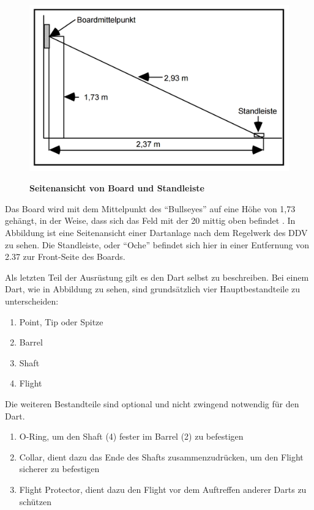 \begin{figure}
\includegraphics[width=\textwidth]{media/Dartsfield}\\
\caption{\textbf{Seitenansicht von Board und Standleiste 
\cite[8]{DartsRegel2016}}
}
\label{Fig:dartsetup}
\end{figure}


Das Board wird mit dem Mittelpunkt des "`Bullseyes"' auf eine Höhe von 1,73 gehängt, in der Weise, dass sich das Feld mit der 20 mittig oben befindet \autocite[6-8]{DartsRegel2016}. In Abbildung  ist eine Seitenansicht einer Dartanlage nach dem Regelwerk des DDV zu sehen. Die Standleiste, oder "`Oche"' befindet sich hier in einer Entfernung von 2.37 zur Front-Seite des Boards. 

Als letzten Teil der Ausrüstung gilt es den Dart selbst zu beschreiben. Bei einem Dart, wie in Abbildung  zu sehen, sind grundsätzlich vier Hauptbestandteile zu unterscheiden:
\begin{enumerate}
    \item Point, Tip oder Spitze
    \item Barrel
    \addtocounter{enumi}{1}
    \item Shaft
    \addtocounter{enumi}{1}
    \item Flight
\end{enumerate}
Die weiteren Bestandteile sind optional und nicht zwingend notwendig für den Dart. 
\begin{enumerate}
	\addtocounter{enumi}{1}
	\addtocounter{enumi}{1}
    \item O-Ring, um den Shaft (4) fester im Barrel (2) zu befestigen
    \item Collar, dient dazu das Ende des Shafts zusammenzudrücken, um den Flight sicherer zu befestigen
    \addtocounter{enumi}{1}
    \item Flight Protector, dient dazu den Flight vor dem Auftreffen anderer Darts zu schützen

\end{enumerate}





